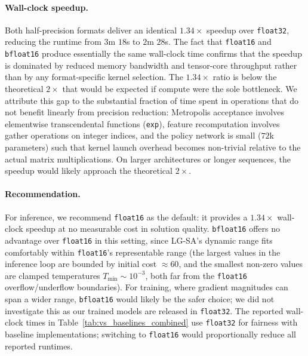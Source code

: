 \documentclass[letterpaper]{article} %
\begin{document}
\paragraph{Wall-clock speedup.}
Both half-precision formats deliver an identical $1.34\times$ speedup over \texttt{float32}, reducing the runtime from $3$m $18$s to $2$m $28$s. The fact that \texttt{float16} and \texttt{bfloat16} produce essentially the same wall-clock time confirms that the speedup is dominated by reduced memory bandwidth and tensor-core throughput rather than by any format-specific kernel selection. The $1.34\times$ ratio is below the theoretical $2\times$ that would be expected if compute were the sole bottleneck. We attribute this gap to the substantial fraction of time spent in operations that do not benefit linearly from precision reduction: Metropolis acceptance involves elementwise transcendental functions (\texttt{exp}), feature recomputation involves gather operations on integer indices, and the policy network is small ($72$k parameters) such that kernel launch overhead becomes non-trivial relative to the actual matrix multiplications. On larger architectures or longer sequences, the speedup would likely approach the theoretical $2\times$.

\paragraph{Recommendation.}
For inference, we recommend \texttt{float16} as the default: it provides a $1.34\times$ wall-clock speedup at no measurable cost in solution quality. \texttt{bfloat16} offers no advantage over \texttt{float16} in this setting, since LG-SA's dynamic range fits comfortably within \texttt{float16}'s representable range (the largest values in the inference loop are bounded by initial cost $\approx 60$, and the smallest non-zero values are clamped temperatures $T_{\min} \sim 10^{-3}$, both far from the \texttt{float16} overflow/underflow boundaries). For training, where gradient magnitudes can span a wider range, \texttt{bfloat16} would likely be the safer choice; we did not investigate this as our trained models are released in \texttt{float32}. The reported wall-clock times in Table~\ref{tab:vs_baselines_combined} use \texttt{float32} for fairness with baseline implementations; switching to \texttt{float16} would proportionally reduce all reported runtimes.
\end{document}
